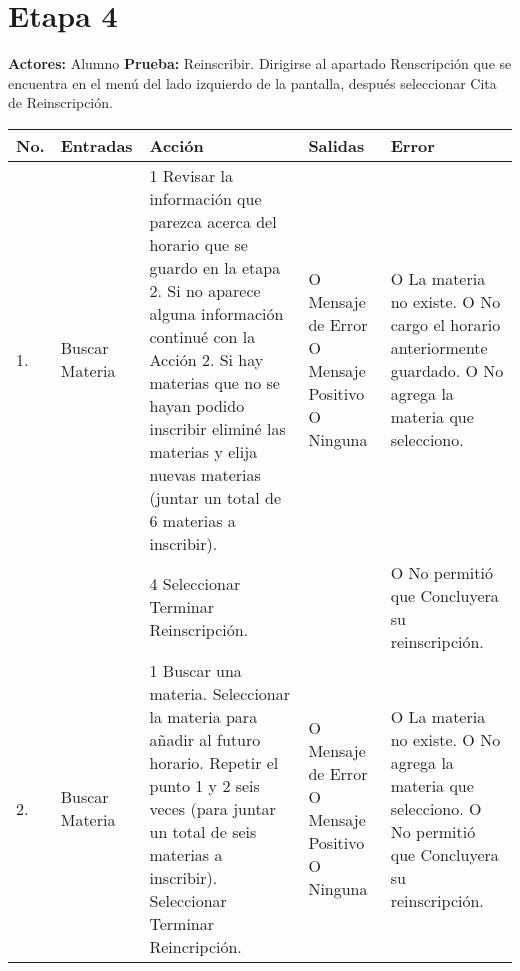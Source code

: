 \section*{Etapa 4}
\textbf{Actores:} Alumno\newline
\textbf{Prueba:} Reinscribir.\newline
Dirigirse al apartado Renscripción que se encuentra en el menú del lado izquierdo de la pantalla, después seleccionar Cita de Reinscripción.
\begin{longtable}{|p{0.7cm}|p{3cm}|p{6cm}|p{2.3cm}|p{3cm}|}
    \hline	
	\textbf{No.}
	&
	\textbf{Entradas}	
	&
	\textbf{Acción}
	&
	\textbf{Salidas}
	&
	\textbf{Error}
	\\
	\hline
	1.
	&
	Buscar Materia	
	&
	1 Revisar la información que parezca acerca del horario que se guardo en la etapa 2.\newline
	2 Si no aparece alguna información continué con la Acción 2.\newline
	3 Si hay materias que no se hayan podido inscribir eliminé las materias y elija nuevas materias (juntar un total de 6 materias a inscribir).
	&
	O Mensaje de Error\newline
 	O Mensaje Positivo\newline
 	O Ninguna	 	 
 	&
 	O La materia no existe.\newline
 	O No cargo el horario anteriormente guardado.\newline
 	O No agrega la materia que selecciono.\\
 	\hline
 	 & &
	4 Seleccionar Terminar Reinscripción. 
	& &
 	O No permitió que Concluyera su reinscripción.\\
	\hline
 	2.
	&
	Buscar Materia	
	&
	1 Buscar una materia.\newline
	2 Seleccionar la materia para añadir  al futuro horario.\newline
	3 Repetir el punto 1 y 2 seis veces (para juntar un total de seis materias a inscribir).\newline
	4 Seleccionar Terminar Reincripción. 	
	&
	O Mensaje de Error\newline
 	O Mensaje Positivo\newline
 	O Ninguna	 	 
 	&
 	O La materia no existe.\newline
 	O No agrega la materia que selecciono.\newline
 	O No permitió que Concluyera su reinscripción.\\
 	\hline
\end{longtable}
